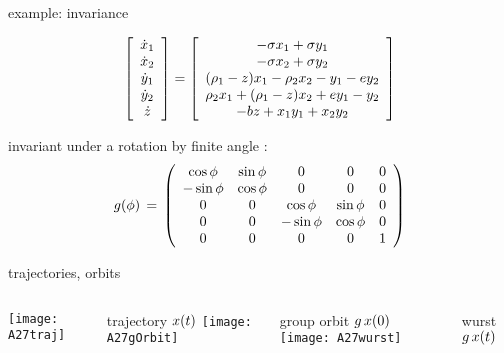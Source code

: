 \begin{frame}{example:  invariance}
			\begin{exampleblock}{{\cLe}}
\scriptsize		
\[
		\left[
					\begin{array}{c}
				\dot{x}_1 \\ \dot{x}_2 \\ \dot{y}_1 \\ \dot{y}_2 \\ \dot{z}
				\end{array}
		\right]
=
		\left[
					\begin{array}{c}
				 -\sigma x_1 + \sigma y_1 \\
				-\sigma x_2 + \sigma y_2 \\
                (\RerCLor-z) x_1 - \ImrCLor x_2 -y_1-e y_2 \\
                \ImrCLor x_1 + (\RerCLor-z) x_2 + e y_1- y_2 \\
				-b z + x_1 y_1 + x_2 y_2
				\end{array}
		\right]
\]
			\end{exampleblock}

\begin{block}{}
invariant under a  rotation by finite angle
\gSpace:
\scriptsize		
\[
\LieEl(\gSpace) \,=\,  \left(\barr{ccccc}
  \cos \gSpace  & \sin \gSpace  & 0 & 0 & 0 \\
 -\sin \gSpace  & \cos \gSpace  & 0 & 0 & 0 \\
 0 & 0 &  \cos \gSpace & \sin \gSpace   & 0 \\
 0 & 0 & -\sin \gSpace & \cos \gSpace   & 0 \\
 0 & 0 & 0             & 0              & 1
    \earr\right)
\] %
\end{block}
\end{frame}

\begin{frame}{trajectories, orbits}
	\begin{columns}[t]
\texttt{[image: A27traj]}

trajectory $\ssp(\zeit)$
\texttt{[image: A27gOrbit]}

group orbit $\LieEl\,\ssp(0)$
\texttt{[image: A27wurst]}

wurst $\LieEl\,\ssp(\zeit)$
	\end{columns}
\end{frame}

